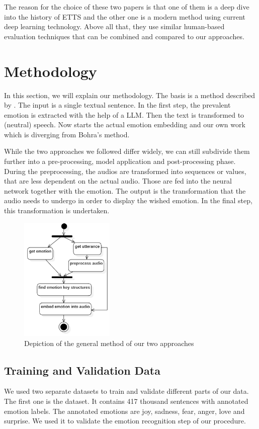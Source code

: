 \documentclass[11pt]{article}
\begin{document}

The reason for the choice of these two papers is that one of them is a deep dive into the history of ETTS and the other one is a modern method using current deep learning technology. Above all that, they use similar human-based evaluation techniques that can be combined and compared to our approaches.

\section{Methodology}
\label{methodology}
In this section, we will explain our methodology. The basis is a method described by \cite{bohra_smart_2022}. The input is a single textual sentence. In the first step, the prevalent emotion is extracted with the help of a LLM. Then the text is transformed to (neutral) speech. Now starts the actual emotion embedding and our own work which is diverging from Bohra's method.

While the two approaches we followed differ widely, we can still subdivide them further into a pre-processing, model application and post-processing phase. During the preprocessing, the audios are transformed into sequences or values, that are less dependent on the actual audio. Those are fed into the neural network together with the emotion. The output is the transformation that the audio needs to undergo in order to display the wished emotion. In the final step, this transformation is undertaken.

\begin{figure}[h]
 \centering
\includegraphics[width=0.4\textwidth]{"Bilder/Prozess.PNG"}
\caption{Depiction of the general method of our two approaches}
\label{Ablauf}
\end{figure}

\subsection{Training and Validation Data}
We used two separate datasets to train and validate different parts of our data.
The first one is the \cite{saravia-etal-2018-carer} dataset. It contains 417 thousand sentences with annotated emotion labels. The annotated emotions are joy, sadness, fear, anger, love and surprise. We used it to validate the emotion recognition step of our procedure.
\end{document}
